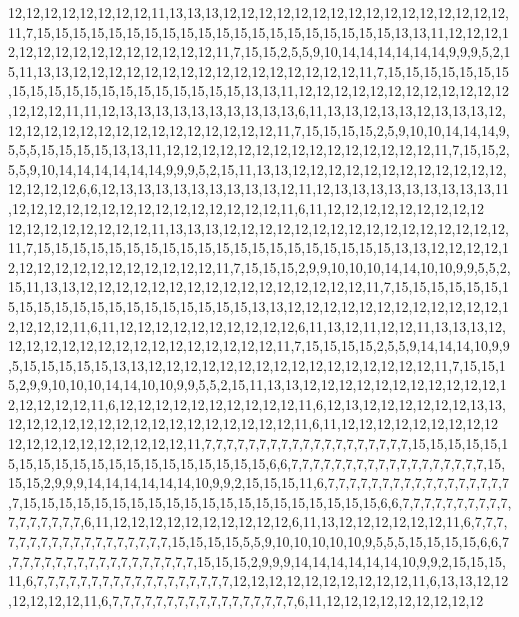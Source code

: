 12,12,12,12,12,12,12,12,11,13,13,13,12,12,12,12,12,12,12,12,12,12,12,12,12,12,12,12,11,7,15,15,15,15,15,15,15,15,15,15,15,15,15,15,15,15,15,15,15,15,13,13,11,12,12,12,12,12,12,12,12,12,12,12,12,12,12,12,11,7,15,15,2,5,5,9,10,14,14,14,14,14,14,9,9,9,5,2,15,11,13,13,12,12,12,12,12,12,12,12,12,12,12,12,12,12,12,12,11,7,15,15,15,15,15,15,15,15,15,15,15,15,15,15,15,15,15,15,15,15,13,13,11,12,12,12,12,12,12,12,12,12,12,12,12,12,12,12,11,11,12,13,13,13,13,13,13,13,13,13,13,6,11,13,13,12,13,13,12,13,13,13,12,12,12,12,12,12,12,12,12,12,12,12,12,12,12,12,11,7,15,15,15,15,2,5,9,10,10,14,14,14,9,5,5,5,15,15,15,15,13,13,11,12,12,12,12,12,12,12,12,12,12,12,12,12,12,12,11,7,15,15,2,5,5,9,10,14,14,14,14,14,14,9,9,9,5,2,15,11,13,13,12,12,12,12,12,12,12,12,12,12,12,12,12,12,12,12,6,6,12,13,13,13,13,13,13,13,13,13,12,11,12,13,13,13,13,13,13,13,13,13,11,12,12,12,12,12,12,12,12,12,12,12,12,12,12,12,11,6,11,12,12,12,12,12,12,12,12,12
12,12,12,12,12,12,12,12,11,13,13,13,12,12,12,12,12,12,12,12,12,12,12,12,12,12,12,12,11,7,15,15,15,15,15,15,15,15,15,15,15,15,15,15,15,15,15,15,15,15,13,13,12,12,12,12,12,12,12,12,12,12,12,12,12,12,12,12,11,7,15,15,15,2,9,9,10,10,10,14,14,10,10,9,9,5,5,2,15,11,13,13,12,12,12,12,12,12,12,12,12,12,12,12,12,12,12,12,11,7,15,15,15,15,15,15,15,15,15,15,15,15,15,15,15,15,15,15,15,15,13,13,12,12,12,12,12,12,12,12,12,12,12,12,12,12,12,12,11,6,11,12,12,12,12,12,12,12,12,12,12,6,11,13,12,11,12,12,11,13,13,13,12,12,12,12,12,12,12,12,12,12,12,12,12,12,12,12,11,7,15,15,15,15,2,5,5,9,14,14,14,10,9,9,5,15,15,15,15,15,13,13,12,12,12,12,12,12,12,12,12,12,12,12,12,12,12,12,11,7,15,15,15,2,9,9,10,10,10,14,14,10,10,9,9,5,5,2,15,11,13,13,12,12,12,12,12,12,12,12,12,12,12,12,12,12,12,12,11,6,12,12,12,12,12,12,12,12,12,12,11,6,12,13,12,12,12,12,12,12,13,13,12,12,12,12,12,12,12,12,12,12,12,12,12,12,12,12,11,6,11,12,12,12,12,12,12,12,12,12
12,12,12,12,12,12,12,12,12,12,11,7,7,7,7,7,7,7,7,7,7,7,7,7,7,7,7,7,7,7,15,15,15,15,15,15,15,15,15,15,15,15,15,15,15,15,15,15,15,15,6,6,7,7,7,7,7,7,7,7,7,7,7,7,7,7,7,7,7,7,15,15,15,2,9,9,9,14,14,14,14,14,14,10,9,9,2,15,15,15,11,6,7,7,7,7,7,7,7,7,7,7,7,7,7,7,7,7,7,7,15,15,15,15,15,15,15,15,15,15,15,15,15,15,15,15,15,15,15,15,6,6,7,7,7,7,7,7,7,7,7,7,7,7,7,7,7,7,7,6,11,12,12,12,12,12,12,12,12,12,12,6,11,13,12,12,12,12,12,12,11,6,7,7,7,7,7,7,7,7,7,7,7,7,7,7,7,7,7,7,15,15,15,15,5,5,9,10,10,10,10,10,9,5,5,5,15,15,15,15,6,6,7,7,7,7,7,7,7,7,7,7,7,7,7,7,7,7,7,7,15,15,15,2,9,9,9,14,14,14,14,14,14,10,9,9,2,15,15,15,11,6,7,7,7,7,7,7,7,7,7,7,7,7,7,7,7,7,7,7,12,12,12,12,12,12,12,12,12,12,11,6,13,13,12,12,12,12,12,12,11,6,7,7,7,7,7,7,7,7,7,7,7,7,7,7,7,7,7,6,11,12,12,12,12,12,12,12,12,12
